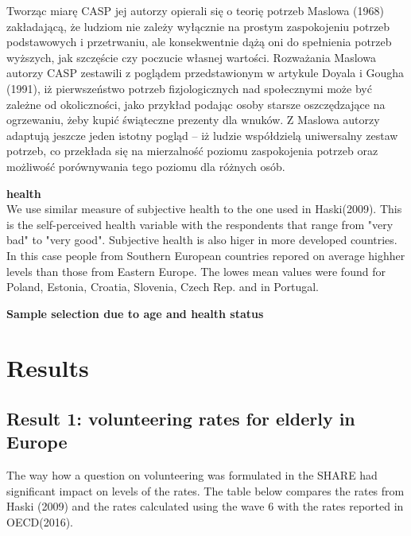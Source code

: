 \documentclass[10pt, letterpaper]{article}
\begin{document}
\begin{spacing}{1.4}
Tworząc miarę CASP jej autorzy opierali się o teorię potrzeb Maslowa (1968) zakładającą, że ludziom nie zależy wyłącznie na prostym zaspokojeniu potrzeb podstawowych i przetrwaniu, ale konsekwentnie dążą oni do spełnienia potrzeb wyższych, jak szczęście czy poczucie własnej wartości. Rozważania Maslowa autorzy CASP zestawili z poglądem przedstawionym w artykule Doyala i Gougha (1991), iż pierwszeństwo potrzeb fizjologicznych nad społecznymi może być zależne od okoliczności, jako przykład podając osoby starsze oszczędzające na ogrzewaniu, żeby kupić świąteczne prezenty dla wnuków. Z Maslowa autorzy adaptują jeszcze jeden istotny pogląd – iż ludzie współdzielą uniwersalny zestaw potrzeb, co przekłada się na mierzalność poziomu zaspokojenia potrzeb oraz możliwość porównywania tego poziomu dla różnych osób. 



\textbf{health} \\
We use similar measure of subjective health to the one used in Haski(2009). This is the self-perceived health variable with the respondents that range from "very bad" to "very good". Subjective health is also higer in more developed countries. In this case people from Southern European countries repored on average highher levels than those from Eastern Europe. The lowes mean values were found for Poland, Estonia, Croatia, Slovenia, Czech Rep. and in Portugal.

\textbf{Sample selection due to age and health status }\\

\section{Results}

\subsection{Result 1: volunteering rates for elderly in Europe}

The way how a question on volunteering was formulated in the SHARE had significant impact on levels of the rates. The table below compares the rates from Haski (2009) and the rates calculated using the wave 6 with the rates reported in OECD(2016).



\end{spacing}
\end{document}
